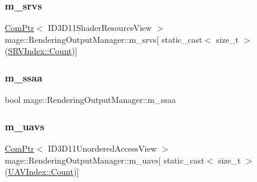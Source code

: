 \hypertarget{classmage_1_1_rendering_output_manager_af0443196d91297ccaff675a90a69adff}{}\label{classmage_1_1_rendering_output_manager_af0443196d91297ccaff675a90a69adff} 
\subsubsection{\texorpdfstring{m\+\_\+srvs}{m\_srvs}}
{\footnotesize\ttfamily \hyperlink{namespacemage_ae74f374780900893caa5555d1031fd79}{Com\+Ptr}$<$ I\+D3\+D11\+Shader\+Resource\+View $>$ mage\+::\+Rendering\+Output\+Manager\+::m\+\_\+srvs\mbox{[} static\+\_\+cast$<$ size\+\_\+t $>$(\hyperlink{classmage_1_1_rendering_output_manager_a25aa12ba77bb160c5641cf54f7a68a29ae93f994f01c537c4e2f7d8528c3eb5e9}{S\+R\+V\+Index\+::\+Count})\mbox{]}\hspace{0.3cm}{\ttfamily [private]}}

\hypertarget{classmage_1_1_rendering_output_manager_a944bc441357c9e1b6af74ec5c393fb63}{}\label{classmage_1_1_rendering_output_manager_a944bc441357c9e1b6af74ec5c393fb63} 
\subsubsection{\texorpdfstring{m\+\_\+ssaa}{m\_ssaa}}
{\footnotesize\ttfamily bool mage\+::\+Rendering\+Output\+Manager\+::m\+\_\+ssaa\hspace{0.3cm}{\ttfamily [private]}}

\hypertarget{classmage_1_1_rendering_output_manager_ad4e780e6340b18f601a1fcfa9dd1b297}{}\label{classmage_1_1_rendering_output_manager_ad4e780e6340b18f601a1fcfa9dd1b297} 
\subsubsection{\texorpdfstring{m\+\_\+uavs}{m\_uavs}}
{\footnotesize\ttfamily \hyperlink{namespacemage_ae74f374780900893caa5555d1031fd79}{Com\+Ptr}$<$ I\+D3\+D11\+Unordered\+Access\+View $>$ mage\+::\+Rendering\+Output\+Manager\+::m\+\_\+uavs\mbox{[} static\+\_\+cast$<$ size\+\_\+t $>$(\hyperlink{classmage_1_1_rendering_output_manager_a34cdd58dd0dda9d78878d79aa3393b89ae93f994f01c537c4e2f7d8528c3eb5e9}{U\+A\+V\+Index\+::\+Count})\mbox{]}\hspace{0.3cm}{\ttfamily [private]}}

